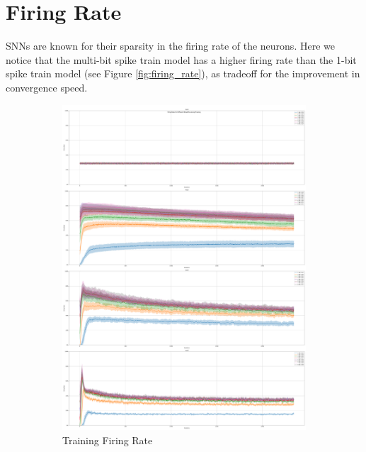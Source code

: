     \section{Firing Rate}
    \label{sec:firing-rate}
        SNNs are known for their sparsity in the firing rate of the neurons. Here we notice that the multi-bit spike train model has a higher firing rate than the 1-bit spike train model (see Figure \ref{fig:firing_rate}), as tradeoff for the improvement in convergence speed. 
        \begin{figure}[!htpb]
            \centering
            \begin{subfigure}[H]{0.48\textwidth}
                \centering
                \includegraphics[width=\textwidth]{../standard/FashionMNIST/plots/fashionmnist_train_firerate.pdf}
                \caption{Training Firing Rate}
            \end{subfigure}
            \hfill
            \begin{subfigure}[H]{0.48\textwidth}

\end{subfigure}
\end{figure}
